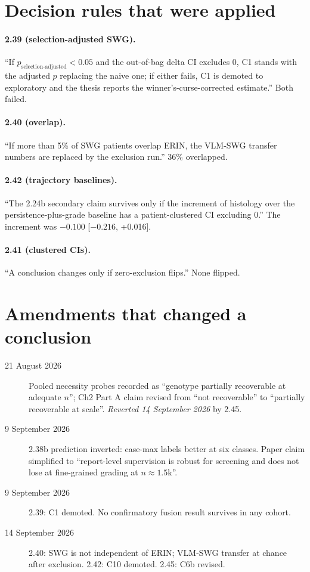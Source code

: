 \section{Decision rules that were applied}

\paragraph{2.39 (selection-adjusted SWG).} ``If $p_{\text{selection-adjusted}} < 0.05$ and the out-of-bag delta CI excludes 0, C1 stands with the adjusted $p$ replacing the naive one; if either fails, C1 is demoted to exploratory and the thesis reports the winner's-curse-corrected estimate.'' Both failed.

\paragraph{2.40 (overlap).} ``If more than 5\% of SWG patients overlap ERIN, the VLM-SWG transfer numbers are replaced by the exclusion run.'' 36\% overlapped.

\paragraph{2.42 (trajectory baselines).} ``The 2.24b secondary claim survives only if the increment of histology over the persistence-plus-grade baseline has a patient-clustered CI excluding 0.'' The increment was $-0.100$ [$-0.216$, +0.016].

\paragraph{2.41 (clustered CIs).} ``A conclusion changes only if zero-exclusion flips.'' None flipped.

\section{Amendments that changed a conclusion}

\begin{description}
\item[21 August 2026] Pooled necessity probes recorded as ``genotype partially recoverable at adequate $n$''; Ch2 Part A claim revised from ``not recoverable'' to ``partially recoverable at scale''. \emph{Reverted 14 September 2026} by 2.45.
\item[9 September 2026] 2.38b prediction inverted: case-max labels better at six classes. Paper claim simplified to ``report-level supervision is robust for screening and does not lose at fine-grained grading at $n\approx1.5$k''.
\item[9 September 2026] 2.39: C1 demoted. No confirmatory fusion result survives in any cohort.
\item[14 September 2026] 2.40: SWG is not independent of ERIN; VLM-SWG transfer at chance after exclusion. 2.42: C10 demoted. 2.45: C6b revised.
\end{description}
